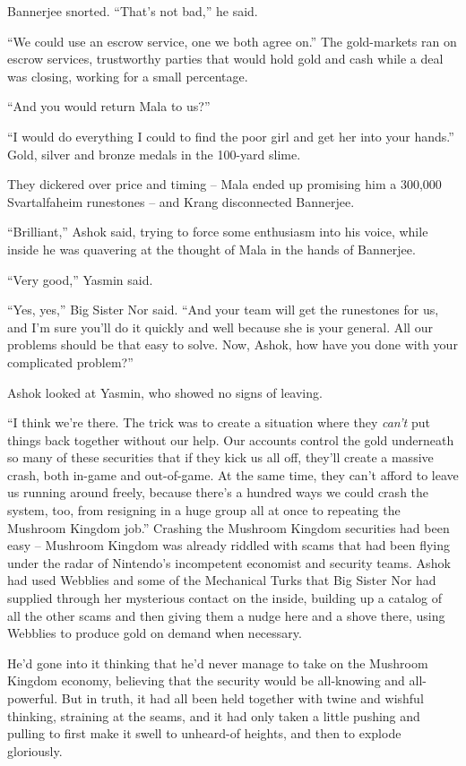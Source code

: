 Bannerjee snorted. ``That's not bad,'' he said.

``We could use an escrow service, one we both agree on.'' The
gold-markets ran on escrow services, trustworthy parties that would
hold gold and cash while a deal was closing, working for a small
percentage.

``And you would return Mala to us?''

``I would do everything I could to find the poor girl and get her
into your hands.'' Gold, silver and bronze medals in the 100-yard
slime.

They dickered over price and timing -- Mala ended up promising him
a 300,000 Svartalfaheim runestones -- and Krang disconnected
Bannerjee.

``Brilliant,'' Ashok said, trying to force some enthusiasm into his
voice, while inside he was quavering at the thought of Mala in the
hands of Bannerjee.

``Very good,'' Yasmin said.

``Yes, yes,'' Big Sister Nor said. ``And your team will get the
runestones for us, and I'm sure you'll do it quickly and well
because she is your general. All our problems should be that easy
to solve. Now, Ashok, how have you done with your complicated
problem?''

Ashok looked at Yasmin, who showed no signs of leaving.

``I think we're there. The trick was to create a situation where
they \emph{can't} put things back together without our help. Our
accounts control the gold underneath so many of these securities
that if they kick us all off, they'll create a massive crash, both
in-game and out-of-game. At the same time, they can't afford to
leave us running around freely, because there's a hundred ways we
could crash the system, too, from resigning in a huge group all at
once to repeating the Mushroom Kingdom job.'' Crashing the Mushroom
Kingdom securities had been easy -- Mushroom Kingdom was already
riddled with scams that had been flying under the radar of
Nintendo's incompetent economist and security teams. Ashok had used
Webblies and some of the Mechanical Turks that Big Sister Nor had
supplied through her mysterious contact on the inside, building up
a catalog of all the other scams and then giving them a nudge here
and a shove there, using Webblies to produce gold on demand when
necessary.

He'd gone into it thinking that he'd never manage to take on the
Mushroom Kingdom economy, believing that the security would be
all-knowing and all-powerful. But in truth, it had all been held
together with twine and wishful thinking, straining at the seams,
and it had only taken a little pushing and pulling to first make it
swell to unheard-of heights, and then to explode gloriously.

